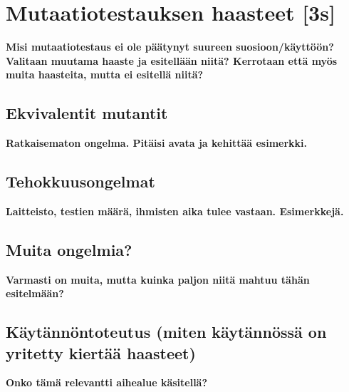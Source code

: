 \documentclass[finnish, grading]{tktltiki2}
\theoremstyle{definition}
\theoremstyle{remark}
\begin{document}
\section{Mutaatiotestauksen haasteet [3s]}

\textbf{Misi mutaatiotestaus ei ole päätynyt suureen suosioon/käyttöön? Valitaan muutama haaste ja esitellään niitä? Kerrotaan että myös muita haasteita, mutta ei esitellä niitä?}

\subsection{Ekvivalentit mutantit}

\textbf{Ratkaisematon ongelma. Pitäisi avata ja kehittää esimerkki.}

\subsection{Tehokkuusongelmat}

\textbf{Laitteisto, testien määrä, ihmisten aika tulee vastaan. Esimerkkejä.}

\subsection{Muita ongelmia?}

\textbf{Varmasti on muita, mutta kuinka paljon niitä mahtuu tähän esitelmään?}

\subsection{Käytännöntoteutus (miten käytännössä on yritetty kiertää haasteet)}

\textbf{Onko tämä relevantti aihealue käsitellä?}



\end{document}
